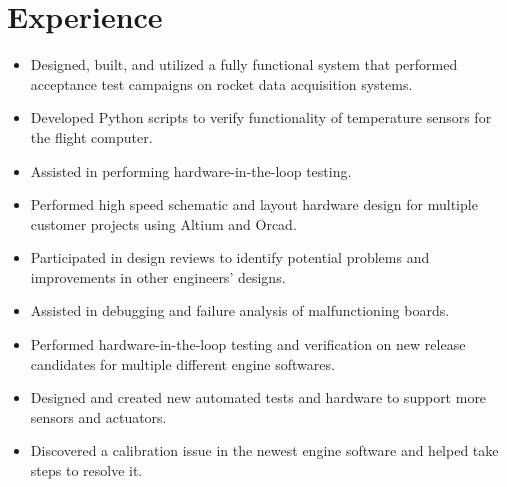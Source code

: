 \documentclass[]{deedy-resume-openfont}
\begin{document}
\begin{minipage}[t]{0.66\textwidth} 


\section{Experience}


\begin{itemize}
    \setlength\itemsep{0pt}
    \item Designed, built, and utilized a fully functional system that performed acceptance test campaigns on rocket data acquisition systems.
    \item Developed Python scripts to verify functionality of temperature sensors for the flight computer. 
    \item Assisted in performing hardware-in-the-loop testing.
\end{itemize}

\sectionsep

\begin{itemize}
    \setlength\itemsep{0pt}
    \item Performed high speed schematic and layout hardware design for multiple customer projects using Altium and Orcad.    
    \item Participated in design reviews to identify potential problems and improvements in other engineers' designs.
    \item Assisted in debugging and failure analysis of malfunctioning boards. 
\end{itemize}

\sectionsep

\begin{itemize}
    \setlength\itemsep{0pt}
    \item Performed hardware-in-the-loop testing and verification on new release candidates for multiple different engine softwares.
    \item Designed and created new automated tests and hardware to support more sensors and actuators.
    \item Discovered a calibration issue in the newest engine software and helped take steps to resolve it. 
\end{itemize}


\end{minipage}
\end{document}
